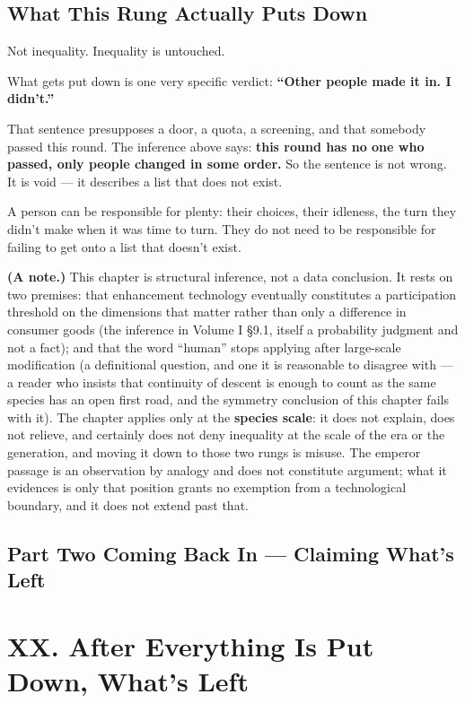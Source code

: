 \documentclass[11pt,a4paper]{article}
\begin{document}
\subsection{What This Rung Actually Puts Down}

Not inequality. Inequality is untouched.

What gets put down is one very specific verdict: \textbf{``Other people made it in. I didn't.''}

That sentence presupposes a door, a quota, a screening, and that somebody passed this round. The inference above says: \textbf{this round has no one who passed, only people changed in some order.} So the sentence is not wrong. It is void --- it describes a list that does not exist.

A person can be responsible for plenty: their choices, their idleness, the turn they didn't make when it was time to turn. They do not need to be responsible for failing to get onto a list that doesn't exist.

\textbf{(A note.)} This chapter is structural inference, not a data conclusion. It rests on two premises: that enhancement technology eventually constitutes a participation threshold on the dimensions that matter rather than only a difference in consumer goods (the inference in Volume I \S{}9.1, itself a probability judgment and not a fact); and that the word ``human'' stops applying after large-scale modification (a definitional question, and one it is reasonable to disagree with --- a reader who insists that continuity of descent is enough to count as the same species has an open first road, and the symmetry conclusion of this chapter fails with it). The chapter applies only at the \textbf{species scale}: it does not explain, does not relieve, and certainly does not deny inequality at the scale of the era or the generation, and moving it down to those two rungs is misuse. The emperor passage is an observation by analogy and does not constitute argument; what it evidences is only that position grants no exemption from a technological boundary, and it does not extend past that.

\subsection{Part Two \textperiodcentered{} Coming Back In --- Claiming What's Left}

\section{XX. After Everything Is Put Down, What's Left}
\end{document}
